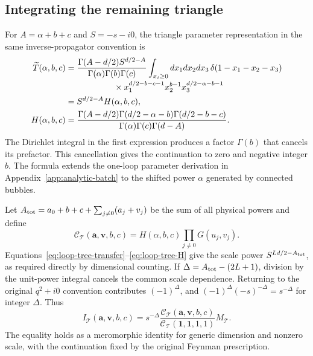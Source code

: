 \subsection{Integrating the remaining triangle}
For $A=\alpha+b+c$ and $S=-s-i0$, the triangle parameter representation in the same inverse-propagator convention is
\begin{align}
 \widetilde T(\alpha,b,c)
 &=\frac{\Gamma(A-d/2)S^{d/2-A}}
 {\Gamma(\alpha)\Gamma(b)\Gamma(c)}
 \int_{x_i\ge0}dx_1dx_2dx_3\,
 \delta(1-x_1-x_2-x_3)\notag\\[-2pt]
 &\hspace{20mm}\times x_1^{d/2-b-c-1}x_2^{b-1}
 x_3^{d/2-\alpha-b-1}\notag\\
 &=S^{d/2-A}H(\alpha,b,c),\label{eq:loop-tree-triangle}\\
 H(\alpha,b,c)
 &=\frac{\Gamma(A-d/2)\Gamma(d/2-\alpha-b)\Gamma(d/2-b-c)}
 {\Gamma(\alpha)\Gamma(c)\Gamma(d-A)}.
 \label{eq:loop-tree-H}
\end{align}
The Dirichlet integral in the first expression produces a factor $\Gamma(b)$ that cancels its prefactor. This cancellation gives the continuation to zero and negative integer $b$. The formula extends the one-loop parameter derivation in Appendix~\ref{app:analytic-batch} to the shifted power $\alpha$ generated by connected bubbles.

Let $A_{\rm tot}=a_0+b+c+\sum_{j\ne0}(a_j+v_j)$ be the sum of all physical powers and define
\begin{equation}
 \mathcal C_{\mathcal T}(\boldsymbol a,\boldsymbol v,b,c)
 =H(\alpha,b,c)\prod_{j\ne0}G(u_j,v_j).
 \label{eq:loop-tree-C}
\end{equation}
Equations~\eqref{eq:loop-tree-transfer}--\eqref{eq:loop-tree-H} give the scale power $S^{Ld/2-A_{\rm tot}}$, as required directly by dimensional counting. If $\Delta=A_{\rm tot}-(2L+1)$, division by the unit-power integral cancels the common scale dependence. Returning to the original $q^2+i0$ convention contributes $(-1)^\Delta$, and $(-1)^\Delta(-s)^{-\Delta}=s^{-\Delta}$ for integer $\Delta$. Thus
\begin{equation}
 I_{\mathcal T}(\boldsymbol a,\boldsymbol v,b,c)=
 s^{-\Delta}\frac{\mathcal C_{\mathcal T}(\boldsymbol a,\boldsymbol v,b,c)}
 {\mathcal C_{\mathcal T}(\boldsymbol 1,\boldsymbol 1,1,1)}M_{\mathcal T}.
 \label{eq:loop-tree-reduction}
\end{equation}
The equality holds as a meromorphic identity for generic dimension and nonzero scale, with the continuation fixed by the original Feynman prescription.

